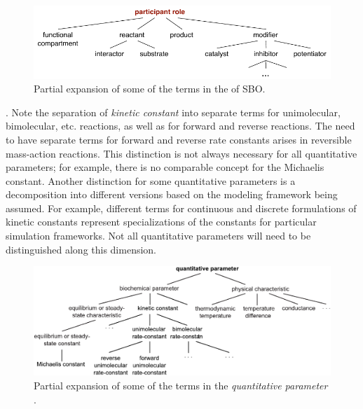 \begin{figure}[htb]
  \centering
  \includegraphics[scale = 0.8]{figs/sbo-participant-role}
  \caption{Partial expansion of some of the terms in the
     of SBO.}
  \label{fig:expanded-speciesRef}
\end{figure}

.  Note the separation of
\emph{kinetic constant} into separate terms for unimolecular,
bimolecular, etc. reactions, as well as for forward and
reverse reactions.  The need to have separate terms for forward
and reverse rate constants arises in reversible mass-action
reactions.  This distinction is not always necessary for all
quantitative parameters; for example, there is no comparable
concept for the Michaelis constant.  Another distinction for some
quantitative parameters is a decomposition into different versions
based on the modeling framework being assumed.  For example,
different terms for continuous and discrete formulations of
kinetic constants represent specializations of the constants for
particular simulation frameworks.  Not all quantitative parameters
will need to be distinguished along this dimension.

\begin{figure}[tbh]
  \vspace*{1ex}
  \centering
  \includegraphics[scale = 0.8]{figs/sbo-quantitative-parameter}
  \caption{Partial expansion of some of the terms in the \emph{quantitative
      parameter} .}
  \label{fig:expanded-parameter}
\end{figure}

